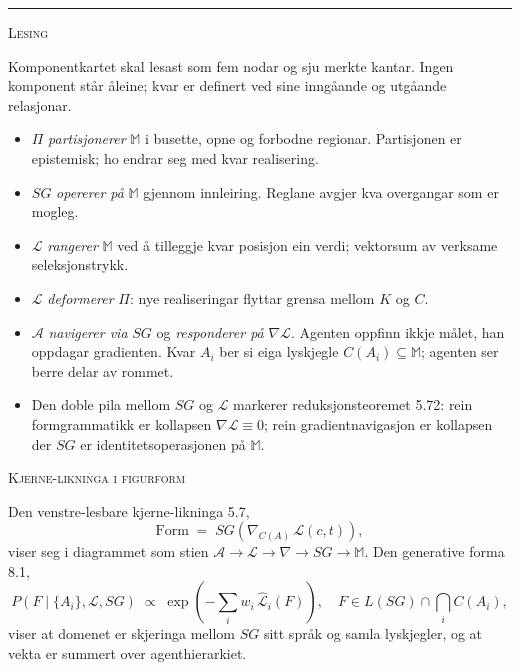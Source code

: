 \documentclass[a4paper,11pt]{article}
\begin{document}
\vspace{0.4em}

\hrule

\vspace{0.4em}

{\scshape\small Lesing}

\vspace{0.3em}

Komponentkartet skal lesast som fem nodar og sju merkte kantar. Ingen komponent står åleine; kvar er definert ved sine inngåande og utgåande relasjonar.

\begin{itemize}
\item $\Pi$ \emph{partisjonerer} $\mathbb{M}$ i busette, opne og forbodne regionar. Partisjonen er epistemisk; ho endrar seg med kvar realisering.
\item $SG$ \emph{opererer på} $\mathbb{M}$ gjennom innleiring. Reglane avgjer kva overgangar som er mogleg.
\item $\mathcal{L}$ \emph{rangerer} $\mathbb{M}$ ved å tilleggje kvar posisjon ein verdi; vektorsum av verksame seleksjonstrykk.
\item $\mathcal{L}$ \emph{deformerer} $\Pi$: nye realiseringar flyttar grensa mellom $K$ og $C$.
\item $\mathcal{A}$ \emph{navigerer via} $SG$ og \emph{responderer på} $\nabla\mathcal{L}$. Agenten oppfinn ikkje målet, han oppdagar gradienten. Kvar $A_i$ ber si eiga lyskjegle $C(A_i)\subseteq\mathbb{M}$; agenten ser berre delar av rommet.
\item Den doble pila mellom $SG$ og $\mathcal{L}$ markerer reduksjonsteoremet 5.72: rein formgrammatikk er kollapsen $\nabla\mathcal{L}\equiv 0$; rein gradientnavigasjon er kollapsen der $SG$ er identitetsoperasjonen på $\mathbb{M}$.
\end{itemize}

\vspace{0.3em}

{\scshape\small Kjerne-likninga i figurform}

\vspace{0.3em}

Den venstre-lesbare kjerne-likninga 5.7,
\[
\text{Form} \;=\; SG\!\left(\nabla_{C(A)}\,\mathcal{L}(c,t)\right),
\]
viser seg i diagrammet som stien $\mathcal{A} \to \mathcal{L} \to \nabla \to SG \to \mathbb{M}$. Den generative forma 8.1,
\[
P(F\mid\{A_i\},\mathcal{L},SG)\;\propto\;\exp\!\left(-\sum_i w_i\,\hat{\mathcal{L}}_i(F)\right),\quad F\in L(SG)\cap\bigcap_i C(A_i),
\]
viser at domenet er skjeringa mellom $SG$ sitt språk og samla lyskjegler, og at vekta er summert over agenthierarkiet.
\end{document}
